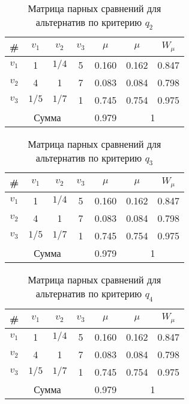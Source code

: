 \begin{table}[H]
    \centering
    \caption{Матрица парных сравнений для альтернатив по критерию $q_2$}\label{crit_q2}
    \begin{tabular}{|c|c|c|c|c|c|c|}
    \hline \# & $v_1$ & $v_2$ & $v_3$ & $\mu$ & $\mu$ & $W_{\mu}$ \\
    \hline $v_1$ & 1 & $1/4$ & 5 & 0.160 & 0.162 & 0.847 \\
    \hline $v_2$ & 4 & 1 & 7 &  0.083 & 0.084 & 0.798\\
    \hline $v_3$ & $1/5$ & $1/7$ & 1 & 0.745 & 0.754 & 0.975 \\
    \hline \multicolumn{4}{|c|}{Сумма} & 0.979 & \multicolumn{2}{|c|}{1} \\
    \hline
    \end{tabular}
\end{table}

\begin{table}[H]
    \centering
    \caption{Матрица парных сравнений для альтернатив по критерию $q_3$}\label{crit_q3}
    \begin{tabular}{|c|c|c|c|c|c|c|}
    \hline \# & $v_1$ & $v_2$ & $v_3$ & $\mu$ & $\mu$ & $W_{\mu}$ \\
    \hline $v_1$ & 1 & $1/4$ & 5 & 0.160 & 0.162 & 0.847 \\
    \hline $v_2$ & 4 & 1 & 7 &  0.083 & 0.084 & 0.798\\
    \hline $v_3$ & $1/5$ & $1/7$ & 1 & 0.745 & 0.754 & 0.975 \\
    \hline \multicolumn{4}{|c|}{Сумма} & 0.979 & \multicolumn{2}{|c|}{1} \\
    \hline
    \end{tabular}
\end{table}

\begin{table}[H]
    \centering
    \caption{Матрица парных сравнений для альтернатив по критерию $q_4$}\label{crit_q4}
    \begin{tabular}{|c|c|c|c|c|c|c|}
    \hline \# & $v_1$ & $v_2$ & $v_3$ & $\mu$ & $\mu$ & $W_{\mu}$ \\
    \hline $v_1$ & 1 & $1/4$ & 5 & 0.160 & 0.162 & 0.847 \\
    \hline $v_2$ & 4 & 1 & 7 &  0.083 & 0.084 & 0.798\\
    \hline $v_3$ & $1/5$ & $1/7$ & 1 & 0.745 & 0.754 & 0.975 \\
    \hline \multicolumn{4}{|c|}{Сумма} & 0.979 & \multicolumn{2}{|c|}{1} \\
    \hline
    \end{tabular}
\end{table}

